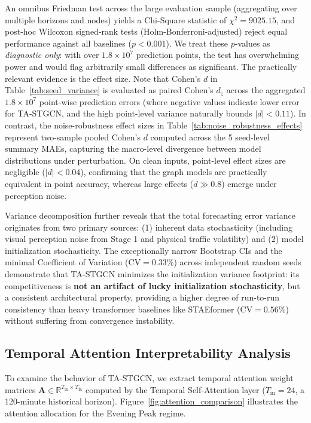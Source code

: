 \documentclass[preprint,12pt]{elsarticle}
\begin{document}
An omnibus Friedman test across the large evaluation sample (aggregating over multiple horizons and nodes) yields a Chi-Square statistic of $\chi^2 = 9025.15$, and post-hoc Wilcoxon signed-rank tests (Holm-Bonferroni-adjusted) reject equal performance against all baselines ($p < 0.001$). We treat these $p$-values as \emph{diagnostic only}: with over $1.8 \times 10^7$ prediction points, the test has overwhelming power and would flag arbitrarily small differences as significant. The practically relevant evidence is the effect size. Note that Cohen's $d$ in Table~\ref{tab:seed_variance} is evaluated as paired Cohen's $d_z$ across the aggregated $1.8 \times 10^7$ point-wise prediction errors (where negative values indicate lower error for TA-STGCN, and the high point-level variance naturally bounds $|d| < 0.11$). In contrast, the noise-robustness effect sizes in Table~\ref{tab:noise_robustness_effects} represent two-sample pooled Cohen's $d$ computed across the 5 seed-level summary MAEs, capturing the macro-level divergence between model distributions under perturbation. On clean inputs, point-level effect sizes are negligible ($|d| < 0.04$), confirming that the graph models are practically equivalent in point accuracy, whereas large effects ($d \gg 0.8$) emerge under perception noise.

Variance decomposition further reveals that the total forecasting error variance originates from two primary sources: (1) inherent data stochasticity (including visual perception noise from Stage 1 and physical traffic volatility) and (2) model initialization stochasticity. The exceptionally narrow Bootstrap CIs and the minimal Coefficient of Variation ($\text{CV} = 0.33\%$) across independent random seeds demonstrate that TA-STGCN minimizes the initialization variance footprint: its competitiveness is \textbf{not an artifact of lucky initialization stochasticity}, but a consistent architectural property, providing a higher degree of run-to-run consistency than heavy transformer baselines like STAEformer ($\text{CV} = 0.56\%$) without suffering from convergence instability.


\subsection{Temporal Attention Interpretability Analysis}
\label{sec:attention_explainability}

To examine the behavior of TA-STGCN, we extract temporal attention weight matrices $\mathbf{A} \in \mathbb{R}^{T_{\text{in}} \times T_{\text{in}}}$ computed by the Temporal Self-Attention layer ($T_{\text{in}} = 24$, a 120-minute historical horizon). Figure~\ref{fig:attention_comparison} illustrates the attention allocation for the Evening Peak regime.
\end{document}
